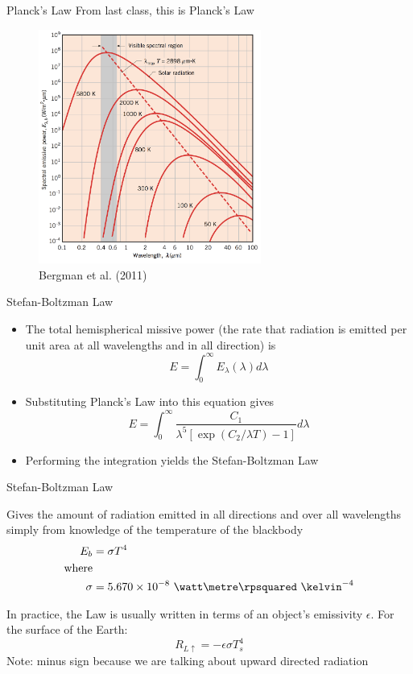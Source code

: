 \begin{frame}{Planck's Law}
From last class, this is Planck's Law
\begin{figure}
\includegraphics[width=0.65\textwidth]{fig1.png}	
\centering \tiny~\\Bergman et al. (2011)
\end{figure}
\end{frame}
\begin{frame}{Stefan-Boltzman Law}
\begin{itemize}
\item The total hemispherical missive power (the rate that radiation is emitted per unit area at all wavelengths and in all direction) is
$$E=\int^{\infty}_0 E_\lambda (\lambda) d\lambda$$
\item Substituting Planck's Law into this equation gives
$$E=\int^{\infty}_0 \frac{C_1}{\lambda^5 \left[\exp (C_2/ \lambda T) - 1 \right] }d\lambda$$
\item Performing the integration yields the Stefan-Boltzman Law
\end{itemize}
\end{frame}
\begin{frame}{Stefan-Boltzman Law}
\begin{fancydefs}
	Gives the amount of radiation emitted in all directions and over all wavelengths simply from knowledge of the temperature of the blackbody
	\begin{align*}
	E_b &= \sigma T^4\\
	\text{where}\\
	\sigma &= 5.670 \times 10^{-8}\ \watt \metre\rpsquared\ \kelvin^{-4}
	\end{align*}
\end{fancydefs}
In practice, the Law is usually written in terms of an object's emissivity $\epsilon$. For the surface of the Earth:
$$R_{L\uparrow} = -\epsilon \sigma T_s^4$$
Note: minus sign because we are talking about upward directed radiation
\end{frame}


